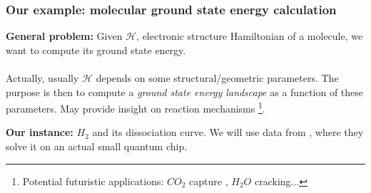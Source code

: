 \documentclass{beamer}
\begin{document}
\begin{frame}
\frametitle{Our example: molecular ground state energy calculation}
\textbf{General problem:} Given $\mathcal{H}$, electronic structure Hamiltonian of a molecule, 
we want to compute its ground state energy.\\~\\
Actually, usually $\mathcal{H}$ depends on some structural/geometric parameters. The purpose
is then to compute a \emph{ground state energy landscape} as a function of these parameters. May provide insight on reaction mechanisms
\footnote{Potential futuristic applications: $CO_{2}$ capture 
\textcolor{blue}{\cite{von2020quantum}}, $H_{2}O$ cracking...}.
\begin{center}
\end{center}

\textbf{Our instance:} $H_{2}$ and its dissociation curve.
We will use data from \textcolor{blue}{\cite{o2016scalable}}, where they solve it on an actual small quantum chip. 
\end{frame}
\end{document}

